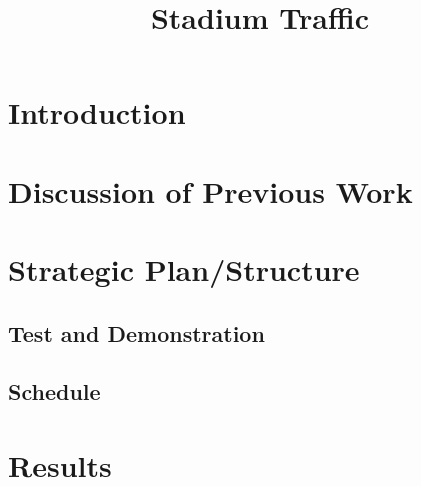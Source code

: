 \documentclass[12pt]{article}
\title{Stadium Traffic}
\begin{document}
\maketitle
\abstract



\newpage

\tableofcontents

\newpage

\mainmatter

\section{Introduction}



\section{Discussion of Previous Work}




\section{Strategic Plan/Structure}




\subsection{Test and Demonstration}



\subsection{Schedule}



\section{Results}
\end{document}
